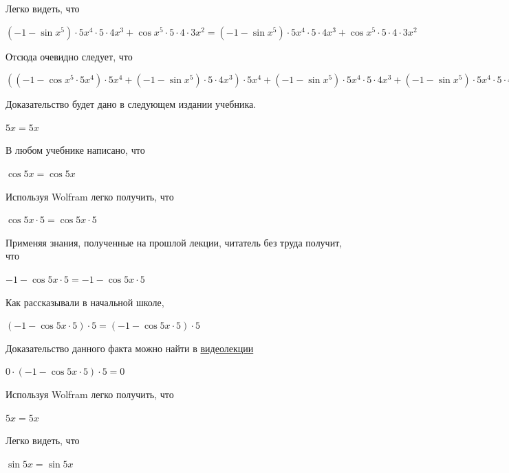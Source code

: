 \documentclass[12pt,a4paper,fleqn]{article}
\theoremstyle{definition}
\begin{document}
Легко видеть, что 

$( -1  - \sin{ x }^{ 5 }) \cdot  5 { x }^{ 4 } \cdot  5  \cdot  4 { x }^{ 3 } + \cos{ x }^{ 5 } \cdot  5  \cdot  4  \cdot  3 { x }^{ 2 } = ( -1  - \sin{ x }^{ 5 }) \cdot  5 { x }^{ 4 } \cdot  5  \cdot  4 { x }^{ 3 } + \cos{ x }^{ 5 } \cdot  5  \cdot  4  \cdot  3 { x }^{ 2 }$

Отсюда очевидно следует, что 

$(( -1  - \cos{ x }^{ 5 } \cdot  5 { x }^{ 4 }) \cdot  5 { x }^{ 4 } + ( -1  - \sin{ x }^{ 5 }) \cdot  5  \cdot  4 { x }^{ 3 }) \cdot  5 { x }^{ 4 } + ( -1  - \sin{ x }^{ 5 }) \cdot  5 { x }^{ 4 } \cdot  5  \cdot  4 { x }^{ 3 } + ( -1  - \sin{ x }^{ 5 }) \cdot  5 { x }^{ 4 } \cdot  5  \cdot  4 { x }^{ 3 } + \cos{ x }^{ 5 } \cdot  5  \cdot  4  \cdot  3 { x }^{ 2 } = (( -1  - \cos{ x }^{ 5 } \cdot  5 { x }^{ 4 }) \cdot  5 { x }^{ 4 } + ( -1  - \sin{ x }^{ 5 }) \cdot  5  \cdot  4 { x }^{ 3 }) \cdot  5 { x }^{ 4 } + ( -1  - \sin{ x }^{ 5 }) \cdot  5 { x }^{ 4 } \cdot  5  \cdot  4 { x }^{ 3 } + ( -1  - \sin{ x }^{ 5 }) \cdot  5 { x }^{ 4 } \cdot  5  \cdot  4 { x }^{ 3 } + \cos{ x }^{ 5 } \cdot  5  \cdot  4  \cdot  3 { x }^{ 2 }$

Доказательство будет дано в следующем издании учебника. 

$ 5  x  =  5  x $

В любом учебнике написано, что 

$\cos 5  x  = \cos 5  x $

Используя Wolfram легко получить, что 

$\cos 5  x  \cdot  5  = \cos 5  x  \cdot  5 $

Применяя знания, полученные на прошлой лекции, читатель без труда получит, что 

$ -1  - \cos 5  x  \cdot  5  =  -1  - \cos 5  x  \cdot  5 $

Как рассказывали в начальной школе, 

$( -1  - \cos 5  x  \cdot  5 ) \cdot  5  = ( -1  - \cos 5  x  \cdot  5 ) \cdot  5 $

Доказательство данного факта можно найти в \href{https://www.youtube.com/watch?v=dQw4w9WgXcQ}{видеолекции} 

$ 0  \cdot ( -1  - \cos 5  x  \cdot  5 ) \cdot  5  =  0 $

Используя Wolfram легко получить, что 

$ 5  x  =  5  x $

Легко видеть, что 

$\sin 5  x  = \sin 5  x $
\end{document}
